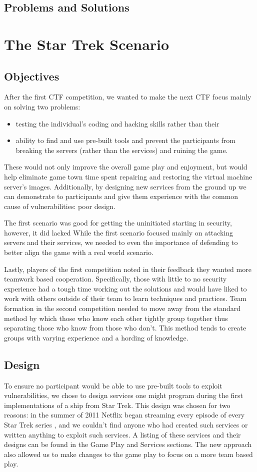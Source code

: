 \documentclass[10pt]{article}
\begin{document}
\subsection{Problems and Solutions}

\section{The Star Trek Scenario}
\subsection{Objectives}
After the first CTF competition, we wanted to make the next CTF focus mainly on
solving two problems:
\begin{itemize}
	\item testing the individual's coding and hacking skills rather than their
	\item ability to find and use pre-built tools and prevent the participants
	from breaking the servers (rather than the services) and ruining the game.
\end{itemize}

These would not only improve the overall game play and enjoyment, but would
help eliminate game town time spent repairing and restoring the virtual machine
server's images. Additionally, by designing new services from the ground up we
can demonstrate to participants and give them experience with the common cause
of vulnerabilities: poor design.

The first scenario was good for getting the uninitiated starting in security,
however, it did lacked While the first scenario focused mainly on attacking
servers and their services, we needed to even the importance of defending to
better align the game with a real world scenario.

Lastly, players of the first competition noted in their feedback they wanted
more teamwork based cooperation. Specifically, those with little to no security
experience had a tough time working out the solutions and would have liked to
work with others outside of their team to learn techniques and practices. Team
formation in the second competition needed to move away from the standard
method by which those who know each other tightly group together thus
separating those who know from those who don't. This method tends to create
groups with varying experience and a hording of knowledge.

\subsection{Design}
\label{stdesign}
To ensure no participant would be able to use pre-built tools to exploit
vulnerabilities, we chose to design services one might program during the first
implementations of a ship from Star Trek. This design was chosen for two
reasons: in the summer of 2011 Netflix began streaming every episode of every
Star Trek series \cite{Netflix}, and we couldn't find anyone who had created
such services or written anything to exploit such services. A listing of these
services and their designs can be found in the Game Play and Services sections.
The new approach also allowed us to make changes to the game play to focus on a
more team based play.
\end{document}
